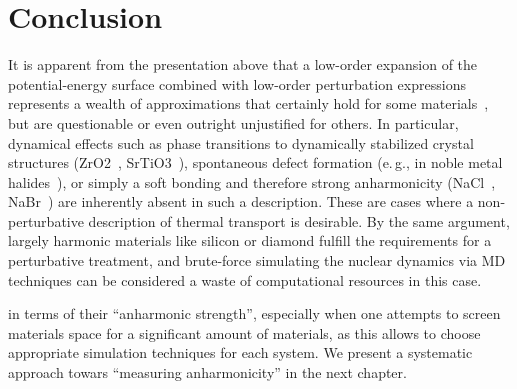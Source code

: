 \section{Conclusion}
It is apparent from the presentation above that a low-order expansion of the potential-energy surface combined with low-order perturbation expressions represents a wealth of approximations that certainly hold for some materials~\cite{Ladd1986,Broido2007,Puligheddu2019}, but are questionable or even outright unjustified for others. In particular, dynamical effects such as phase transitions to dynamically stabilized crystal structures (ZrO2~\cite{Carbogno2014,Carbogno2016}, SrTiO3~\cite{Tadano2015}), spontaneous defect formation (e.\,g., in noble metal halides~\cite{Ulrich1999,Brenner2020}), or simply a soft bonding and therefore strong anharmonicity (NaCl~\cite{Ravichandran2018}, NaBr~\cite{Shen2020}) are inherently absent in such a description. These are cases where a non-perturbative description of thermal transport is desirable. By the same argument, largely harmonic materials like silicon or diamond fulfill the requirements for a perturbative treatment, and brute-force simulating the nuclear dynamics via MD techniques can be considered a waste of computational resources in this case.

 in terms of their ``anharmonic strength'', especially when one attempts to screen materials space for a significant amount of materials, as this allows to choose appropriate simulation techniques for each system. We present a systematic approach towars ``measuring anharmonicity'' in the next chapter.
